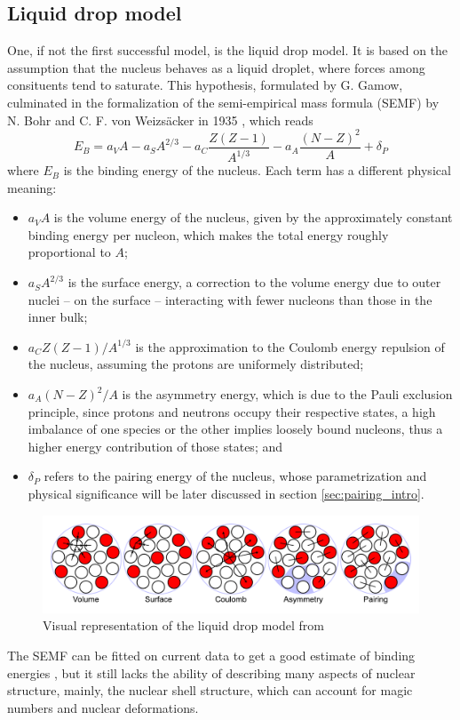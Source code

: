 \subsection{Liquid drop model}
One, if not the first successful model, is the liquid drop model. It is based on the assumption that the nucleus behaves as a liquid droplet, where forces among consituents tend to saturate. This hypothesis, formulated by G. Gamow, culminated in the formalization of the semi-empirical mass formula (SEMF) by N. Bohr and C. F. von Weizsäcker in 1935 \cite{Weizsacker1935}, which reads
\begin{equation}
    \label{eq:semf}
    E_B=a_V A - a_S A^{2/3} - a_C \frac{Z(Z-1)}{A^{1/3}} - a_A \frac{(N-Z)^2}{A} + \delta_P
\end{equation}
where $E_B$ is the binding energy of the nucleus. Each term has a different physical meaning:
\begin{itemize}
    \item $a_V A$ is the volume energy of the nucleus, given by the approximately constant binding energy per nucleon, which makes the total energy roughly proportional to $A$;
    \item $a_S A^{2/3}$ is the surface energy, a correction to the volume energy due to outer nuclei -- on the surface -- interacting with fewer nucleons than those in the inner bulk;
    \item $a_C Z(Z-1)/A^{1/3}$ is the approximation to the Coulomb energy repulsion of the nucleus, assuming the protons are uniformely distributed;
    \item $a_A (N-Z)^2/A$ is the asymmetry energy, which is due to the Pauli exclusion principle, since protons and neutrons occupy their respective states, a high imbalance of one species or the other implies loosely bound nucleons, thus a higher energy contribution of those states; and
    \item $\delta_P$ refers to the pairing energy of the nucleus, whose parametrization and physical significance will be later discussed in section \ref{sec:pairing_intro}.
\end{itemize}
\begin{figure}[h]
    \centering
    \includegraphics[width=1.0\textwidth]{Images/Liquid_drop_model.pdf}
    \caption{Visual representation of the liquid drop model from \cite{ldmimg}}
    \label{fig:liquid_drop_model}
\end{figure}
The SEMF can be fitted on current data to get a good estimate of binding energies \cite{Benzaid2020}, but it still lacks the ability of describing many aspects of nuclear structure, mainly, the nuclear shell structure, which can account for magic numbers and nuclear deformations.
